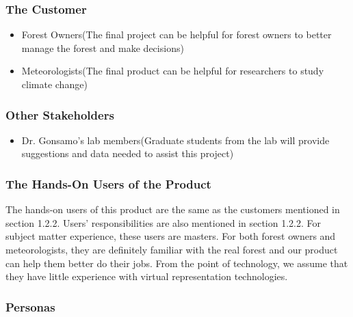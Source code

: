 \documentclass{article}
\begin{document}
\subsubsection{The Customer}
\begin{itemize}
    \item Forest Owners(The final project can be helpful for forest owners to better manage the 
    forest and make decisions)
    \item Meteorologists(The final product can be helpful for researchers to 
    study climate change)
\end{itemize}
\subsubsection{Other Stakeholders}
\begin{itemize}
    \item Dr. Gonsamo's lab members(Graduate students from the lab will provide suggestions and
    data needed to assist this project)
\end{itemize}
\subsubsection{The Hands-On Users of the Product}
The hands-on users of this product are the same as the customers mentioned in section 1.2.2. Users'
responsibilities are also mentioned in section 1.2.2. For subject matter experience, these 
users are masters. For both forest owners and meteorologists, they are definitely
familiar with the real forest and our product can help them better do
their jobs. From the point of technology, we assume that they 
have little experience with virtual representation
technologies.
\subsubsection{Personas}
\end{document}
